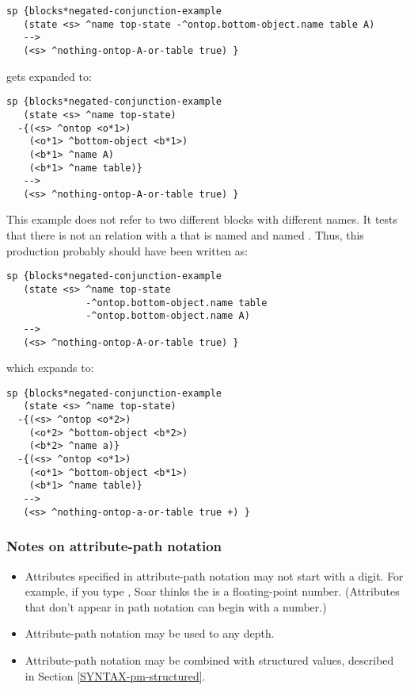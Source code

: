 \begin{verbatim}
sp {blocks*negated-conjunction-example
   (state <s> ^name top-state -^ontop.bottom-object.name table A)
   -->
   (<s> ^nothing-ontop-A-or-table true) }
\end{verbatim}

gets expanded to:

\begin{verbatim}
sp {blocks*negated-conjunction-example
   (state <s> ^name top-state)
  -{(<s> ^ontop <o*1>)
    (<o*1> ^bottom-object <b*1>)
    (<b*1> ^name A)
    (<b*1> ^name table)}
   -->
   (<s> ^nothing-ontop-A-or-table true) }
\end{verbatim}

This example does not refer to two different blocks with different
names. It tests that there is not an  relation with a
 that is named  and named . Thus, this
production probably should have been written as:

\begin{verbatim}
sp {blocks*negated-conjunction-example
   (state <s> ^name top-state 
              -^ontop.bottom-object.name table
              -^ontop.bottom-object.name A)
   -->
   (<s> ^nothing-ontop-A-or-table true) }
\end{verbatim}

which expands to: 
\begin{verbatim}
sp {blocks*negated-conjunction-example
   (state <s> ^name top-state)
  -{(<s> ^ontop <o*2>)
    (<o*2> ^bottom-object <b*2>)
    (<b*2> ^name a)}
  -{(<s> ^ontop <o*1>)
    (<o*1> ^bottom-object <b*1>)
    (<b*1> ^name table)}
   -->
   (<s> ^nothing-ontop-a-or-table true +) }
\end{verbatim}

\subsubsection*{Notes on attribute-path notation}\vspace{-12pt}
\begin{itemize}
\item Attributes specified in attribute-path notation may not start with a
        digit. For example, if you type , Soar thinks
        the  is a floating-point number. (Attributes that don't
        appear in path notation can begin with a number.)

\item Attribute-path notation may be used to any depth.

\item Attribute-path notation may be combined with structured values,
        described in Section \ref{SYNTAX-pm-structured}.

\end{itemize}


